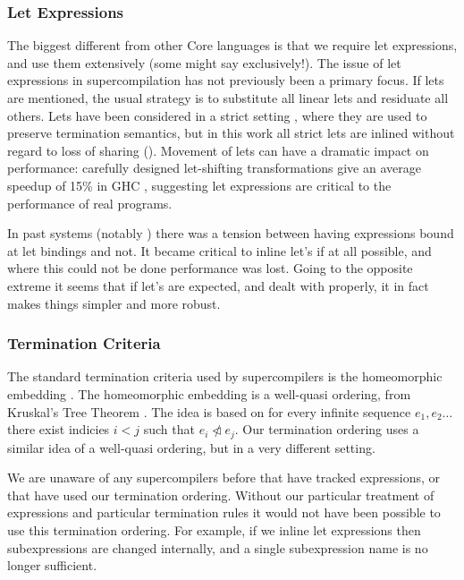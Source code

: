 \documentclass[draft]{sigplanconf}
\begin{document}
\subsubsection{Let Expressions}

The biggest different from other Core languages is that we require let expressions, and use them extensively (some might say exclusively!). The issue of let expressions in supercompilation has not previously been a primary focus. If lets are mentioned, the usual strategy is to substitute all linear lets and residuate all others. Lets have been considered in a strict setting \cite{jonsson:supercompilationpopl}, where they are used to preserve termination semantics, but in this work all strict lets are inlined without regard to loss of sharing (). Movement of lets can have a dramatic impact on performance: carefully designed let-shifting transformations give an average speedup of 15\% in GHC \cite{spj:letfloating}, suggesting let expressions are critical to the performance of real programs.

In past systems (notably \cite{me:ifl2007post}) there was a tension between having expressions bound at let bindings and not. It became critical to inline let's if at all possible, and where this could not be done performance was lost. Going to the opposite extreme it seems that if let's are expected, and dealt with properly, it in fact makes things simpler and more robust.

\subsubsection{Termination Criteria}

The standard termination criteria used by supercompilers is the homeomorphic embedding \cite{leuschel:hoemomorphic}. The homeomorphic embedding is a well-quasi ordering, from Kruskal's Tree Theorem \cite{kruskal:tree}. The idea is based on for every infinite sequence $e_1,e_2 \ldots$ there exist indicies $i < j$ such that $e_i \ntriangleleft e_j$. Our termination ordering uses a similar idea of a well-quasi ordering, but in a very different setting.

We are unaware of any supercompilers before that have tracked expressions, or that have used our termination ordering. Without our particular treatment of expressions and particular termination rules it would not have been possible to use this termination ordering. For example, if we inline let expressions then subexpressions are changed internally, and a single subexpression name is no longer sufficient.
\end{document}
